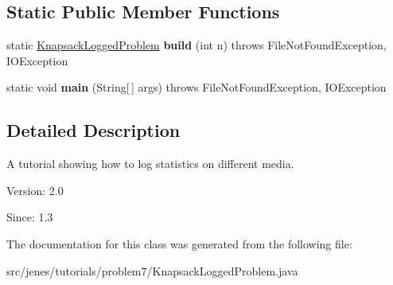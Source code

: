 \subsection*{Static Public Member Functions}
\begin{CompactItemize}
\item 
\hypertarget{classjenes_1_1tutorials_1_1problem7_1_1_knapsack_logged_problem_541dbb7113b95fa6e579502e847ac36f}{
static \hyperlink{classjenes_1_1tutorials_1_1problem7_1_1_knapsack_logged_problem}{KnapsackLoggedProblem} \textbf{build} (int n)  throws FileNotFoundException, IOException }
\label{classjenes_1_1tutorials_1_1problem7_1_1_knapsack_logged_problem_541dbb7113b95fa6e579502e847ac36f}

\item 
\hypertarget{classjenes_1_1tutorials_1_1problem7_1_1_knapsack_logged_problem_b2896c85405a58a8a2c3474375bf2ac8}{
static void \textbf{main} (String\mbox{[}$\,$\mbox{]} args)  throws FileNotFoundException, IOException }
\label{classjenes_1_1tutorials_1_1problem7_1_1_knapsack_logged_problem_b2896c85405a58a8a2c3474375bf2ac8}

\end{CompactItemize}


\subsection{Detailed Description}
A tutorial showing how to log statistics on different media.

\begin{Desc}
\item[Version:]2.0 \end{Desc}
\begin{Desc}
\item[Since:]1.3 \end{Desc}


The documentation for this class was generated from the following file:\begin{CompactItemize}
\item 
src/jenes/tutorials/problem7/KnapsackLoggedProblem.java\end{CompactItemize}
